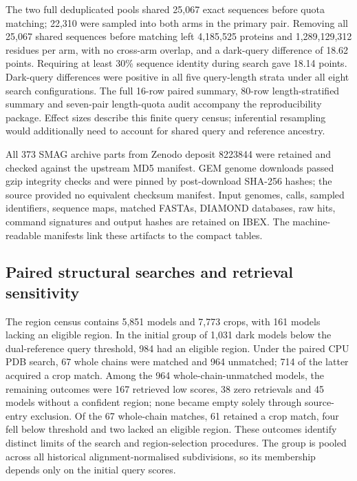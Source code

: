 \documentclass[11pt]{article}
\begin{document}
The two full deduplicated pools shared 25{,}067 exact sequences before quota matching;
22{,}310 were sampled into both arms in the primary pair. Removing all 25{,}067 shared sequences
before matching left 4{,}185{,}525 proteins and 1{,}289{,}129{,}312 residues per arm, with no
cross-arm overlap, and a dark-query difference of 18.62 points. Requiring at least 30\%
sequence identity during search gave 18.14 points. Dark-query differences were positive in
all five query-length strata under all eight search configurations. The full 16-row paired
summary, 80-row length-stratified summary and seven-pair length-quota audit accompany the
reproducibility package. Effect sizes describe this finite query census; inferential
resampling would additionally need to account for shared query and reference ancestry.

All 373 SMAG archive parts from Zenodo deposit 8223844 were retained and checked against the
upstream MD5 manifest. GEM genome downloads passed gzip integrity checks and were pinned by
post-download SHA-256 hashes; the source provided no equivalent checksum manifest.
Input genomes, calls, sampled identifiers, sequence maps, matched FASTAs, DIAMOND databases,
raw hits, command signatures and output hashes are retained on IBEX. The machine-readable
manifests link these artifacts to the compact tables.


\subsection*{Paired structural searches and retrieval sensitivity}
The region census contains 5{,}851 models and 7{,}773 crops, with 161 models lacking an eligible
region. In the initial group of 1{,}031 dark models below the dual-reference query threshold,
984 had an eligible region. Under the paired CPU PDB search, 67 whole chains were matched and
964 unmatched; 714 of the latter acquired a crop match. Among the 964 whole-chain-unmatched models, the remaining outcomes were 167 retrieved low
scores, 38 zero retrievals and 45 models without a confident region; none became empty solely
through source-entry exclusion. Of the 67 whole-chain matches, 61 retained a crop match, four
fell below threshold and two lacked an eligible region. These outcomes identify distinct
limits of the search and region-selection procedures. The group is pooled across all historical
alignment-normalised subdivisions, so its membership depends only on the initial query scores.
\end{document}

